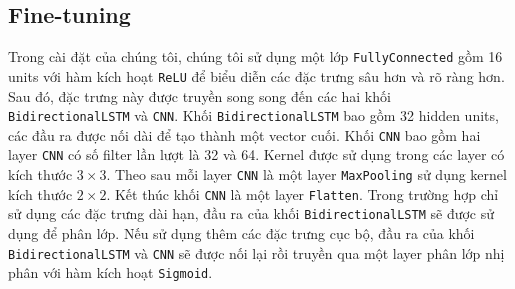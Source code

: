 \subsection{Fine-tuning}

Trong cài đặt của chúng tôi, chúng tôi sử dụng một lớp \verb|FullyConnected| gồm 16 units với hàm kích hoạt \verb|ReLU| để biểu diễn các đặc trưng sâu hơn và rõ ràng hơn. Sau đó, đặc trưng này được truyền song song đến các hai khối \verb|BidirectionalLSTM| và \verb|CNN|. Khối \verb|BidirectionalLSTM| bao gồm 32 hidden units, các đầu ra được nối dài để tạo thành một vector cuối. Khối \verb|CNN| bao gồm hai layer \verb|CNN| có số filter lần lượt là 32 và 64. Kernel được sử dụng trong các layer có kích thước $3\times 3$. Theo sau mỗi layer \verb|CNN| là một layer \verb|MaxPooling| sử dụng kernel kích thước $2\times 2$. Kết thúc khối \verb|CNN| là một layer \verb|Flatten|. Trong trường hợp chỉ sử dụng các đặc trưng dài hạn, đầu ra của khối \verb|BidirectionalLSTM| sẽ được sử dụng để phân lớp. Nếu sử dụng thêm các đặc trưng cục bộ, đầu ra của khối \verb|BidirectionalLSTM| và \verb|CNN| sẽ được nối lại rồi truyền qua một layer phân lớp nhị phân với hàm kích hoạt \verb|Sigmoid|.


